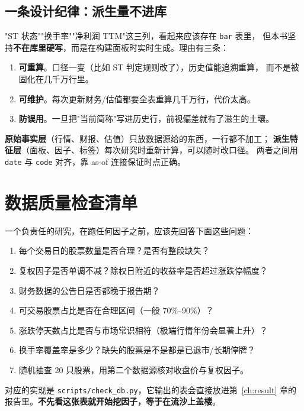 \subsection{一条设计纪律：派生量不进库}

"ST 状态""换手率""净利润 TTM"这三列，看起来应该存在 \texttt{bar} 表里，
但本书坚持\textbf{不在库里硬写}，而是在构建面板时实时生成。理由有三条：

\begin{enumerate}
  \item \textbf{可重算}。口径一变（比如 ST 判定规则改了），历史值能追溯重算，
        而不是被固化在几千万行里。
  \item \textbf{可维护}。每次更新财务/估值都要全表重算几千万行，代价太高。
  \item \textbf{防误用}。一旦把"当前简称"写进历史行，前视偏差就有了滋生的土壤。
\end{enumerate}

\begin{keybox}[数据库的分层原则]
\textbf{原始事实层}（行情、财报、估值）只放数据源给的东西，一行都不加工；
\textbf{派生特征层}（面板、因子、标签）每次研究时重新计算，可以随时改口径。
两者之间用 \texttt{date} 与 \texttt{code} 对齐，靠 as-of 连接保证时点正确。
\end{keybox}

\section{数据质量检查清单}

一个负责任的研究，在跑任何因子之前，应该先回答下面这些问题：

\begin{enumerate}
  \item 每个交易日的股票数量是否合理？是否有整段缺失？
  \item 复权因子是否单调不减？除权日附近的收益率是否超过涨跌停幅度？
  \item 财务数据的公告日是否都晚于报告期？
  \item 可交易股票占比是否在合理区间（一般 70\%--90\%）？
  \item 涨跌停天数占比是否与市场常识相符（极端行情年份会显著上升）？
  \item 换手率覆盖率是多少？缺失的股票是不是都是已退市/长期停牌？
  \item 随机抽查 20 只股票，用第二个数据源核对收盘价与复权因子。
\end{enumerate}

对应的实现是 \texttt{scripts/check\_db.py}，它输出的表会直接放进第~\ref{ch:result}
章的报告里。\textbf{不先看这张表就开始挖因子，等于在流沙上盖楼}。

